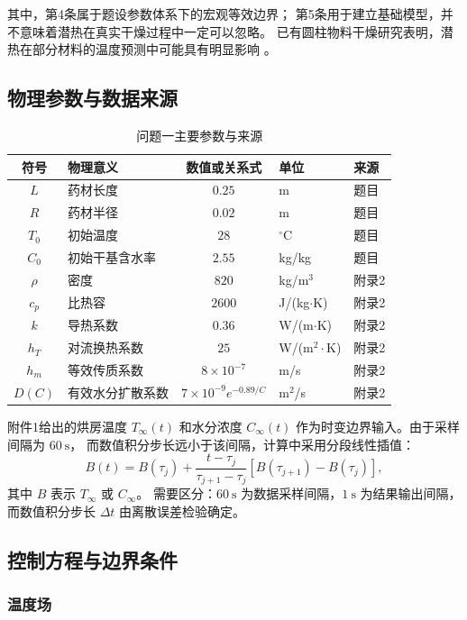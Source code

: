 \documentclass[UTF8,a4paper,11pt]{ctexart}
\begin{document}
其中，第4条属于题设参数体系下的宏观等效边界；
第5条用于建立基础模型，并不意味着潜热在真实干燥过程中一定可以忽略。
已有圆柱物料干燥研究表明，潜热在部分材料的温度预测中可能具有明显影响
\cite{dasilva2014}。

\subsection{物理参数与数据来源}

\begin{table}[H]
\centering
\caption{问题一主要参数与来源}
\begin{tabular}{clcll}
\toprule
符号 & 物理意义 & 数值或关系式 & 单位 & 来源\\
\midrule
$L$ & 药材长度 & $0.25$ & m & 题目\\
$R$ & 药材半径 & $0.02$ & m & 题目\\
$T_0$ & 初始温度 & $28$ & $^\circ$C & 题目\\
$C_0$ & 初始干基含水率 & $2.55$ & kg/kg & 题目\\
$\rho$ & 密度 & $820$ & kg/m$^3$ & 附录2\\
$c_p$ & 比热容 & $2600$ & J/(kg$\cdot$K) & 附录2\\
$k$ & 导热系数 & $0.36$ & W/(m$\cdot$K) & 附录2\\
$h_T$ & 对流换热系数 & $25$ & W/(m$^2\cdot$K) & 附录2\\
$h_m$ & 等效传质系数 & $8\times10^{-7}$ & m/s & 附录2\\
$D(C)$ & 有效水分扩散系数 & $7\times10^{-9}e^{-0.89/C}$ & m$^2$/s & 附录2\\
\bottomrule
\end{tabular}
\end{table}

附件1给出的烘房温度 $T_\infty(t)$ 和水分浓度 $C_\infty(t)$
作为时变边界输入。由于采样间隔为 $60~\mathrm s$，
而数值积分步长远小于该间隔，计算中采用分段线性插值：
\[
B(t)=B(\tau_j)+
\frac{t-\tau_j}{\tau_{j+1}-\tau_j}
\left[B(\tau_{j+1})-B(\tau_j)\right],
\]
其中 $B$ 表示 $T_\infty$ 或 $C_\infty$。
需要区分：$60~\mathrm s$ 为数据采样间隔，$1~\mathrm s$ 为结果输出间隔，
而数值积分步长 $\Delta t$ 由离散误差检验确定。

\subsection{控制方程与边界条件}

\subsubsection{温度场}
\end{document}
